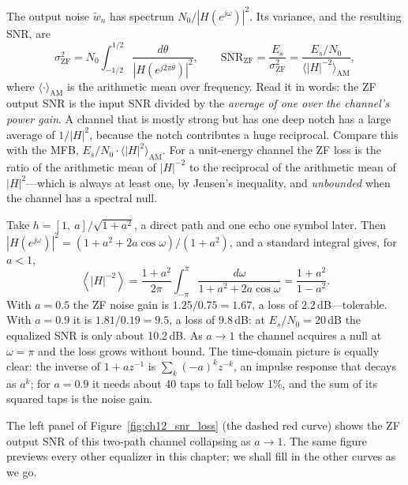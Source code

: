 The output noise $\tilde w_n$ has spectrum $N_0/|H(e^{j\omega})|^2$. Its variance, and the
resulting SNR, are
\begin{equation}
\sigma^2_{\mathrm{ZF}}=N_0\int_{-1/2}^{1/2}\frac{d\theta}{|H(e^{j2\pi\theta})|^2},\qquad
\mathrm{SNR}_{\mathrm{ZF}}=\frac{E_s}{\sigma^2_{\mathrm{ZF}}}=
\frac{E_s/N_0}{\big\langle |H|^{-2}\big\rangle_{\mathrm{AM}}},
\label{eq:ch12:zfsnr}
\end{equation}
where $\langle\cdot\rangle_{\mathrm{AM}}$ is the arithmetic mean over frequency. Read it in words:
the ZF output SNR is the input SNR divided by the \emph{average of one over the channel's power
gain}. A channel that is mostly strong but has one deep notch has a large average of $1/|H|^2$,
because the notch contributes a huge reciprocal. Compare this with the MFB,
$E_s/N_0\cdot\langle|H|^2\rangle_{\mathrm{AM}}$. For a unit-energy channel the ZF loss is the ratio
of the arithmetic mean of $|H|^{-2}$ to the reciprocal of the arithmetic mean of $|H|^2$---which is
always at least one, by Jensen's inequality, and \emph{unbounded} when the channel has a spectral
null.

\begin{worked}
Take $h=[1,\ a]/\sqrt{1+a^2}$, a direct path and one echo one symbol later. Then
$|H(e^{j\omega})|^2=(1+a^2+2a\cos\omega)/(1+a^2)$, and a standard integral gives, for $a<1$,
\[
\left\langle|H|^{-2}\right\rangle=\frac{1+a^2}{2\pi}\int_{-\pi}^{\pi}\frac{d\omega}{1+a^2+2a\cos\omega}
=\frac{1+a^2}{1-a^2}.
\]
With $a=0.5$ the ZF noise gain is $1.25/0.75=1.67$, a loss of 2.2\,dB---tolerable. With $a=0.9$ it is
$1.81/0.19=9.5$, a loss of 9.8\,dB: at $E_s/N_0=20$\,dB the equalized SNR is only about 10.2\,dB.
As $a\to1$ the channel acquires a null at $\omega=\pi$ and the loss grows without bound. The time-domain
picture is equally clear: the inverse of $1+az^{-1}$ is $\sum_k(-a)^kz^{-k}$, an impulse
response that decays as $a^k$; for $a=0.9$ it needs about 40 taps to fall below 1\%, and the sum of
its squared taps is the noise gain.
\end{worked}

The left panel of Figure~\ref{fig:ch12_snr_loss} (the dashed red curve) shows the ZF output SNR of
this two-path channel collapsing as $a\to1$. The same figure previews every other equalizer in
this chapter; we shall fill in the other curves as we go.


